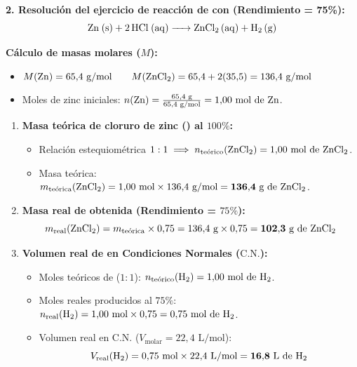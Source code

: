 ﻿\documentclass[11pt,a4paper]{article}
\begin{document}
\vspace{0.4cm}
\noindent\textbf{2. Resolución del ejercicio de reacción de  con  (Rendimiento = 75\%):}
\[
\ce{Zn (s) + 2 HCl (aq) -> ZnCl2 (aq) + H2 (g)}
\]

\noindent\textbf{Cálculo de masas molares ($M$):}
\begin{itemize}[leftmargin=1.5em, itemsep=2pt]
    \item $M(\ce{Zn}) = 65{,}4\text{ g/mol} \qquad M(\ce{ZnCl2}) = 65{,}4 + 2(35{,}5) = 136{,}4\text{ g/mol}$
    \item Moles de zinc iniciales: $n(\ce{Zn}) = \frac{65{,}4\text{ g}}{65{,}4\text{ g/mol}} = 1{,}00\text{ mol de \ce{Zn}}$.
\end{itemize}

\begin{enumerate}[label=\textbf{\alph*)}, leftmargin=2em, itemsep=5pt]
    \item \textbf{Masa teórica de cloruro de zinc () al $100\%$:}
    \begin{itemize}[leftmargin=1.5em, itemsep=3pt]
        \item Relación estequiométrica $1:1 \implies n_{\text{teórico}}(\ce{ZnCl2}) = 1{,}00\text{ mol de \ce{ZnCl2}}$.
        \item Masa teórica: $m_{\text{teórica}}(\ce{ZnCl2}) = 1{,}00\text{ mol} \times 136{,}4\text{ g/mol} = \mathbf{136{,}4\text{ g de \ce{ZnCl2}}}$.
    \end{itemize}

    \item \textbf{Masa real de  obtenida (Rendimiento = $75\%$):}
    \[
    m_{\text{real}}(\ce{ZnCl2}) = m_{\text{teórica}} \times 0{,}75 = 136{,}4\text{ g} \times 0{,}75 = \mathbf{102{,}3\text{ g de \ce{ZnCl2}}}
    \]

    \item \textbf{Volumen real de  en Condiciones Normales ($\text{C.N.}$):}
    \begin{itemize}[leftmargin=1.5em, itemsep=3pt]
        \item Moles teóricos de  ($1:1$): $n_{\text{teórico}}(\ce{H2}) = 1{,}00\text{ mol de \ce{H2}}$.
        \item Moles reales producidos al $75\%$: $n_{\text{real}}(\ce{H2}) = 1{,}00\text{ mol} \times 0{,}75 = 0{,}75\text{ mol de \ce{H2}}$.
        \item Volumen real en C.N. ($V_{\text{molar}} = 22{,}4\text{ L/mol}$):
        \[
        V_{\text{real}}(\ce{H2}) = 0{,}75\text{ mol} \times 22{,}4\text{ L/mol} = \mathbf{16{,}8\text{ L de \ce{H2}}}
        \]
    \end{itemize}
\end{enumerate}
\end{document}
